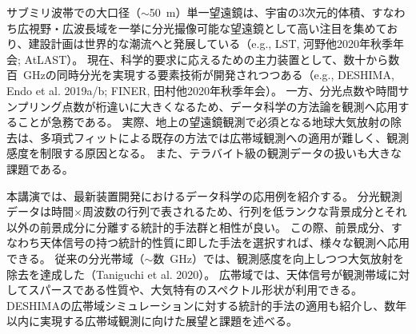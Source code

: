\documentclass[ja]{2021a}
\begin{document}
サブミリ波帯での大口径（$\sim$50~m）単一望遠鏡は、宇宙の3次元的体積、すなわち広視野・広波長域を一挙に分光撮像可能な望遠鏡として高い注目を集めており、建設計画は世界的な潮流へと発展している（e.g., LST, 河野他2020年秋季年会; AtLAST）。
現在、科学的要求に応えるための主力装置として、数十から数百~GHzの同時分光を実現する要素技術が開発されつつある（e.g., DESHIMA, Endo et al. 2019a/b; FINER, 田村他2020年秋季年会）。
一方、分光点数や時間サンプリング点数が桁違いに大きくなるため、データ科学の方法論を観測へ応用することが急務である。
実際、地上の望遠鏡観測で必須となる地球大気放射の除去は、多項式フィットによる既存の方法では広帯域観測への適用が難しく、観測感度を制限する原因となる。
また、テラバイト級の観測データの扱いも大きな課題である。

本講演では、最新装置開発におけるデータ科学の応用例を紹介する。
分光観測データは時間$\times$周波数の行列で表されるため、行列を低ランクな背景成分とそれ以外の前景成分に分離する統計的手法群と相性が良い。
この際、前景成分、すなわち天体信号の持つ統計的性質に即した手法を選択すれば、様々な観測へ応用できる。
従来の分光帯域（$\sim$数~GHz）では、観測感度を向上しつつ大気放射を除去を達成した（Taniguchi et al. 2020）。
広帯域では、天体信号が観測帯域に対してスパースである性質や、大気特有のスペクトル形状が利用できる。
DESHIMAの広帯域シミュレーションに対する統計的手法の適用も紹介し、数年以内に実現する広帯域観測に向けた展望と課題を述べる。
\end{document}
